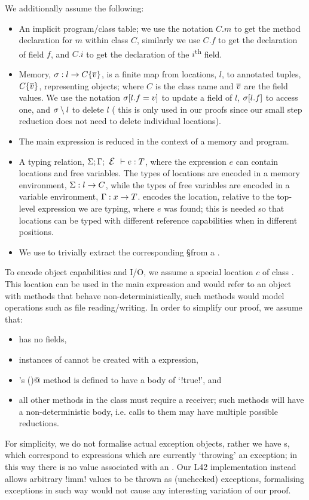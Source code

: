 We additionally assume the following:
\begin{itemize}
	\item An implicit program/class table; we use the notation $C.m$ to get the method declaration for $m$ within class $C$, similarly we use $C.f$ to get the declaration of field $f$, and $C.i$ to get the declaration of the $i$\textsuperscript{th} field.
	\item Memory, $\s : l\rightarrow C\{\Many{v}\}${, is} a finite map from locations, $l$, to annotated tuples, $C\{\Many{v}\}$, representing objects; where $C$ is the class name and $\Many{v}$ are the field values.
	We use the notation $\s[l.f=v]$ to update a field of $l$, $\s[l.f]$ to access one, and $\s \setminus l$ to delete $l$ (
this is only used in our proofs since our small step reduction does not need to delete individual locations).
	\item The main expression is reduced in the context of a memory and program.
	\item A typing relation, $\S;\G;\E\vdash e:T$, where 
	the expression $e$ can contain locations and free variables. The types of locations are encoded in 
a memory environment, 
$\S : l\rightarrow C$,
	while the types of free variables are encoded in
a variable environment, $\G : x\rightarrow T$. \E encodes the location, relative to the top-level expression we are typing, where $e$ was found; this is needed so that locations can be typed with different reference capabilities when in different positions.
	\item We use \Ss to trivially extract the corresponding \S from a \s.
\end{itemize}

\noindent To encode object capabilities and I/O, we assume a special location  $c$ of class \Q@Cap@. This location can be used in the main expression and would refer to an object with methods that behave non-deterministically, such methods would model operations such as file reading/writing. In order to simplify our proof, we assume that:
\begin{itemize}
	\item \Q@Cap@ has no fields,
	\item instances of \Q@Cap@ cannot be created with a \Q@new@ expression,
	\item \Q@Cap@'s \Q@invariant()@ method is defined to have a body of `\Q!true!', and
	\item all other methods in the \Q@Cap@ class must require a \Q@mut@ receiver; such methods will have a non-deterministic body, i.e. calls to them may have multiple possible reductions.
\end{itemize}
For simplicity, we do not formalise actual exception objects, rather we have \error{}s, which correspond to expressions which are currently  `throwing' an exception; 
in this way there is no value associated with an \error.
Our L42 implementation instead allows arbitrary \Q!imm! values to be thrown as (unchecked) exceptions, formalising exceptions in such way would not cause any interesting variation of our proof.


